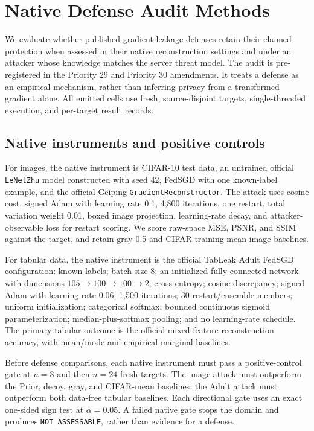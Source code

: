\section{Native Defense Audit Methods}
\label{sec:native-audit-methods}

We evaluate whether published gradient-leakage defenses retain their claimed
protection when assessed in their native reconstruction settings and under an
attacker whose knowledge matches the server threat model.  The audit is
pre-registered in the Priority 29 and Priority 30 amendments.  It treats a
defense as an empirical mechanism, rather than inferring privacy from a
transformed gradient alone.  All emitted cells use fresh, source-disjoint
targets, single-threaded execution, and per-target result records.

\subsection{Native instruments and positive controls}
For images, the native instrument is CIFAR-10 test data, an untrained official
\texttt{LeNetZhu} model constructed with seed 42, FedSGD with one known-label
example, and the official Geiping \texttt{GradientReconstructor}.  The attack
uses cosine cost, signed Adam with learning rate 0.1, 4,800 iterations, one
restart, total variation weight 0.01, boxed image projection, learning-rate
decay, and attacker-observable loss for restart scoring.  We score raw-space
MSE, PSNR, and SSIM against the target, and retain gray 0.5 and CIFAR training
mean image baselines.

For tabular data, the native instrument is the official TabLeak Adult FedSGD
configuration: known labels; batch size 8; an initialized fully connected
network with dimensions $105\rightarrow100\rightarrow100\rightarrow2$;
cross-entropy; cosine discrepancy; signed Adam with learning rate 0.06; 1,500
iterations; 30 restart/ensemble members; uniform initialization; categorical
softmax; bounded continuous sigmoid parameterization; median-plus-softmax
pooling; and no learning-rate schedule.  The primary tabular outcome is the
official mixed-feature reconstruction accuracy, with mean/mode and empirical
marginal baselines.

Before defense comparisons, each native instrument must pass a positive-control
gate at $n=8$ and then $n=24$ fresh targets.  The image attack must outperform
the Prior, decoy, gray, and CIFAR-mean baselines; the Adult attack must
outperform both data-free tabular baselines.  Each directional gate uses an
exact one-sided sign test at $\alpha=0.05$.  A failed native gate stops the
domain and produces \texttt{NOT\_ASSESSABLE}, rather than evidence for a
defense.

